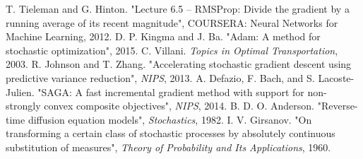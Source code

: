 \documentclass[11pt]{book}
\begin{document}
\begin{thebibliography}{99}
 T. Tieleman and G. Hinton. "Lecture 6.5 -- RMSProp: Divide the gradient by a running average of its recent magnitude", COURSERA: Neural Networks for Machine Learning, 2012.
 D. P. Kingma and J. Ba. "Adam: A method for stochastic optimization", 2015.
 C. Villani. \emph{Topics in Optimal Transportation}, 2003.
 R. Johnson and T. Zhang. "Accelerating stochastic gradient descent using predictive variance reduction", \emph{NIPS}, 2013.
 A. Defazio, F. Bach, and S. Lacoste-Julien. "SAGA: A fast incremental gradient method with support for non-strongly convex composite objectives", \emph{NIPS}, 2014.
 B. D. O. Anderson. "Reverse-time diffusion equation models", \emph{Stochastics}, 1982.
 I. V. Girsanov. "On transforming a certain class of stochastic processes by absolutely continuous substitution of measures", \emph{Theory of Probability and Its Applications}, 1960.
\end{thebibliography}
\end{document}
